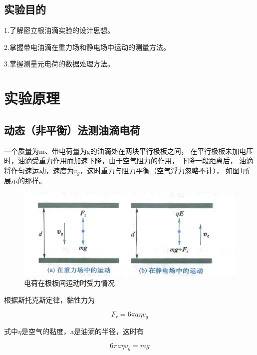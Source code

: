 \documentclass{ctexart}
\begin{document}
  \subsection{实验目的}
  1.\quad 了解密立根油滴实验的设计思想。

  2.\quad 掌握带电油滴在重力场和静电场中运动的测量方法。
  
  3.\quad 掌握测量元电荷的数据处理方法。

\section{实验原理}
  \subsection{动态（非平衡）法测油滴电荷}
  一个质量为m、带电荷量为g的油滴处在两块平行极板之间，
  在平行极板未加电压时，油滴受重力作用而加速下降，由于空气阻力的作用，
  下降一段距离后，
  油滴将作匀速运动，速度为$v_{g}$，这时重力与阻力平衡（空气浮力忽略不计），
  如图\ref{shouli}所展示的那样。

  \begin{figure}[H]
    \centering
    \includegraphics[height=0.6\textwidth,width=1\textwidth]{shouli.jpg}
    \caption{电荷在极板间运动时受力情况}\label{shouli}
  \end{figure}

  根据斯托克斯定律，黏性力为

  \begin{equation}
    F_{r}=6 \pi a \eta v_{g}
  \end{equation}

  式中$\eta$是空气的黏度，a是油滴的半径，这时有

  \begin{equation}
    6 \pi a \eta v_{g} = m g
  \end{equation}
\end{document}
